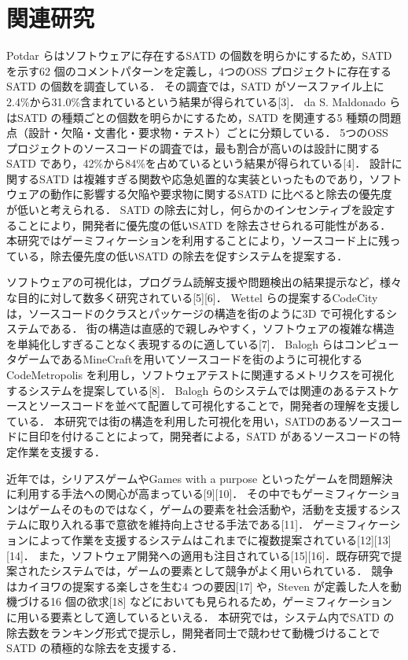 \chapter{関連研究}
Potdar らはソフトウェアに存在するSATD の個数を明らかにするため，SATD を示す62 個のコメントパターンを定義し，4つのOSS プロジェクトに存在するSATD の個数を調査している．
その調査では，SATD がソースファイル上に2.4\%から31.0\%含まれているという結果が得られている[3]．
da S. Maldonado らはSATD の種類ごとの個数を明らかにするため，SATD を関連する5 種類の問題点（設計・欠陥・文書化・要求物・テスト）ごとに分類している．
5つのOSS プロジェクトのソースコードの調査では，最も割合が高いのは設計に関するSATD であり，42\%から84\%を占めているという結果が得られている[4]．
設計に関するSATD は複雑すぎる関数や応急処置的な実装といったものであり，ソフトウェアの動作に影響する欠陥や要求物に関するSATD に比べると除去の優先度が低いと考えられる．
SATD の除去に対し，何らかのインセンティブを設定することにより，開発者に優先度の低いSATD を除去させられる可能性がある．
本研究ではゲーミフィケーションを利用することにより，ソースコード上に残っている，除去優先度の低いSATD の除去を促すシステムを提案する．


ソフトウェアの可視化は，プログラム読解支援や問題検出の結果提示など，様々な目的に対して数多く研究されている[5][6]．
Wettel らの提案するCodeCity は，ソースコードのクラスとパッケージの構造を街のように3D で可視化するシステムである．
街の構造は直感的で親しみやすく，ソフトウェアの複雑な構造を単純化しすぎることなく表現するのに適している[7]．
Balogh らはコンピュータゲームであるMineCraftを用いてソースコードを街のように可視化するCodeMetropolis を利用し，ソフトウェアテストに関連するメトリクスを可視化するシステムを提案している[8]．
Balogh らのシステムでは関連のあるテストケースとソースコードを並べて配置して可視化することで，開発者の理解を支援している．
本研究では街の構造を利用した可視化を用い，SATDのあるソースコードに目印を付けることによって，開発者による，SATD があるソースコードの特定作業を支援する．


近年では，シリアスゲームやGames with a purpose といったゲームを問題解決に利用する手法への関心が高まっている[9][10]．
その中でもゲーミフィケーションはゲームそのものではなく，ゲームの要素を社会活動や，活動を支援するシステムに取り入れる事で意欲を維持向上させる手法である[11]．
ゲーミフィケーションによって作業を支援するシステムはこれまでに複数提案されている[12][13][14]．
また，ソフトウェア開発への適用も注目されている[15][16]．既存研究で提案されたシステムでは，ゲームの要素として競争がよく用いられている．
競争はカイヨワの提案する楽しさを生む4 つの要因[17] や，Steven が定義した人を動機づける16 個の欲求[18] などにおいても見られるため，ゲーミフィケーションに用いる要素として適しているといえる．
本研究では，システム内でSATD の除去数をランキング形式で提示し，開発者同士で競わせて動機づけることでSATD の積極的な除去を支援する．